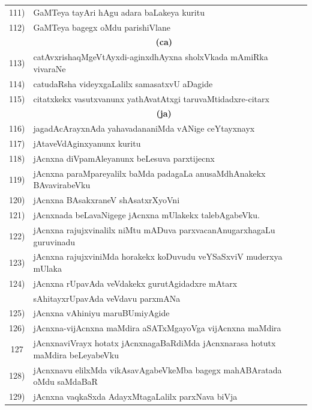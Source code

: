 {\begin{longtable}{@{}cp{7.4cm}r}
111) & GaMTeya tayAri hAgu adara baLakeya kuritu & \pageref{page148}\\
112) & GaMTeya bagegx oMdu parishiVlane & \pageref{page170}\\[0.3cm]
     & \multicolumn{1}{c}{\textbf{(ca)}} & \\[0.3cm]    
113) & catAvxrishaqMgeVtAyxdi-aginxdhAyxna sholxVkada mAmiRka vivaraNe &  \pageref{page209}\\
114) & catudaRsha videyxgaLalilx samasatxvU aDagide & \pageref{page197}\\
115) & citatxkekx vasutxvanunx yathAvatAtxgi taruvaMtidadxre-citarx & \pageref{page200}\\[0.3cm]
     &  \multicolumn{1}{c}{\textbf{(ja)}}  & \\[0.3cm]
116) & jagadAcArayxnAda yahavadananiMda vANige ceYtayxnayx &   \pageref{page128}\\
117) & jAtaveVdAginxyanunx kuritu & \pageref{page212}\\
118) & jAcnxna diVpamAleyanunx beLesuva parxtijecnx &   \pageref{page81}\\
119) & jAcnxna paraMpareyalilx baMda padagaLa anusaMdhAnakekx BAvavirabeVku & \pageref{page140}\\
120) & jAcnxna BAsakxraneV shAsatxrXyoVni & \pageref{page168}\\
121) & jAcnxnada beLavaNigege jAcnxna mUlakekx talebAgabeVku. & \pageref{page68}\\
122) & jAcnxna rajujxvinalilx niMtu mADuva parxvacanAnugarxhagaLu guruvinadu & \pageref{page82}\\ 
123) & jAcnxna rajujxviniMda horakekx koDuvudu veYSaSxviV muderxya mUlaka & \pageref{page83}\\
124) & jAcnxna rUpavAda veVdakekx gurutAgidadxre mAtarx & \\
     & sAhitayxrUpavAda veVdavu parxmANa  & \pageref{page137}\\
125) & jAcnxna vAhiniyu maruBUmiyAgide & \pageref{page110}\\
126) & jAcnxna-vijAcnxna maMdira aSATxMgayoVga vijAcnxna maMdira & \pageref{page73}\\
127  & jAcnxnaviVrayx hotatx jAcnxnagaBaRdiMda jAcnxnarasa hotutx maMdira beLeyabeVku & \pageref{page79}\\ 
128) & jAcnxnavu elilxMda vikAsavAgabeVkeMba bagegx mahABAratada oMdu saMdaBaR & \pageref{page162}\\
129) & jAcnxna vaqkaSxda AdayxMtagaLalilx parxNava biVja & \pageref{page138}\\

\end{longtable}}

